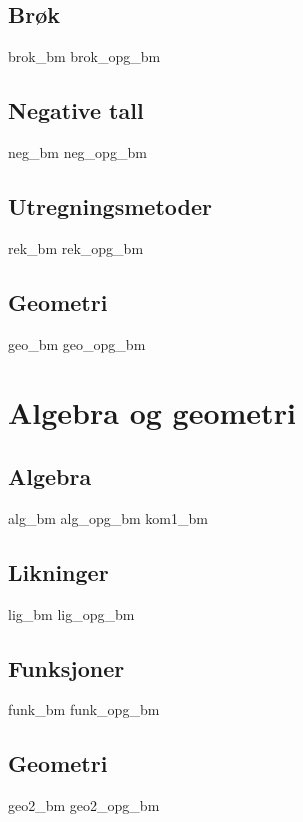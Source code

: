 \chapter{Brøk \label{Brok}} 
\newpage
{brok_bm}
\newpage
{brok_opg_bm}

\chapter{Negative tall \label{Negtal}}
\newpage
{neg_bm}
{neg_opg_bm}

\chapter{Utregningsmetoder \label{Utrekning}}
\newpage
{rek_bm}
\newpage
{rek_opg_bm}

\chapter{Geometri \label{Geometri}}
\newpage
{geo_bm}
{geo_opg_bm}

\part{Algebra og geometri \label{Del2}}
\chapter{Algebra \label{Algebra}}
\newpage
{alg_bm}
{alg_opg_bm}
\newpage
{kom1_bm}

\chapter{Likninger \label{Likningar}}
\newpage
{lig_bm}
{lig_opg_bm}

\chapter{Funksjoner \label{Funksjoner}}
{funk_bm}
{funk_opg_bm}

\chapter{Geometri \label{Geometri2}}
\newpage
{geo2_bm}
{geo2_opg_bm}

